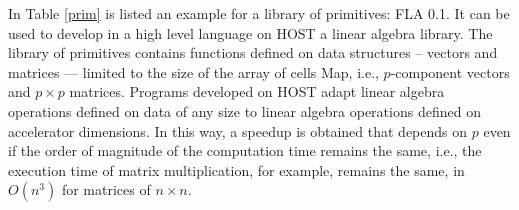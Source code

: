 \begin{exemplu}
In Table \ref{prim} is listed an example for a library of primitives:  FLA 0.1. It can be used to develop in a high level language on HOST a linear algebra library. The library of primitives contains functions defined on data structures -- vectors and matrices --- limited to the size of the array of cells  Map, i.e., $p$-component vectors and $p \times p$ matrices. Programs developed on HOST adapt linear algebra operations defined on data of any size to linear algebra operations defined on accelerator dimensions. In this way, a speedup is obtained that depends on $p$ even if the order of magnitude of the computation time remains the same, i.e., the execution time of matrix multiplication, for example, remains the same, in $O(n^3)$ for matrices of $n \times n$.


\end{exemplu}
